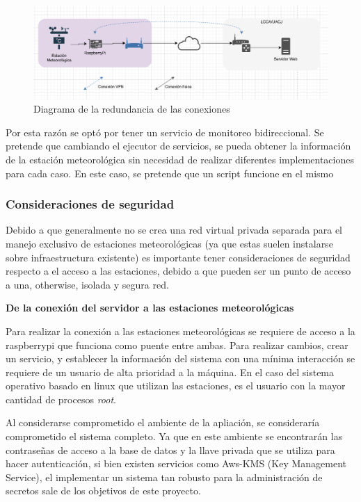 \begin{figure}[!ht]
	\centering
	\includegraphics[width=.75\linewidth]{images/diagrams/conexion.png}
	\caption{Diagrama de la redundancia de las conexiones}
	\label{fig:conexion_redundancia}
\end{figure}

Por esta razón se optó por tener un servicio de monitoreo bidireccional. Se pretende que cambiando el ejecutor de servicios, se pueda obtener la información de la estación meteorológica sin necesidad de realizar diferentes implementaciones para cada caso. En este caso, se pretende que un script funcione en el mismo

\subsubsection{Consideraciones de seguridad}

Debido a que generalmente no se crea una red virtual privada separada para el manejo exclusivo de estaciones meteorológicas (ya que estas suelen instalarse sobre infraestructura existente) es importante tener consideraciones de seguridad respecto a el acceso a las estaciones, debido a que pueden ser un punto de acceso a una, otherwise, isolada y segura red.


\textbf{De la conexión del servidor a las estaciones meteorológicas}

Para realizar la conexión a las estaciones meteorológicas se requiere de acceso a la raspberrypi que funciona como puente entre ambas. Para realizar cambios, crear un servicio, y establecer la información del sistema con una mínima interacción se requiere de un usuario de alta prioridad a la máquina. En el caso del sistema operativo basado en linux que utilizan las estaciones, es el usuario con la mayor cantidad de procesos \emph{root}.

Al considerarse comprometido el ambiente de la apliación, se consideraría comprometido el sistema completo. Ya que en este ambiente se encontrarán las contraseñas de acceso a la base de datos y la llave privada que se utiliza para hacer autenticación, si bien existen servicios como Aws-KMS (Key Management Service), el implementar un sistema tan robusto para la administración de secretos sale de los objetivos de este proyecto.

